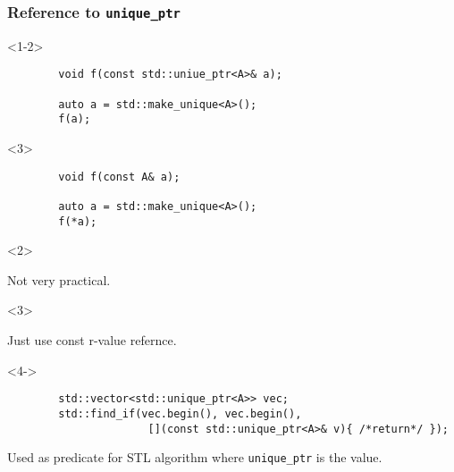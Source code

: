\documentclass{beamer}
\begin{document}
\begin{frame}[fragile,t]
\frametitle{Reference to \texttt{unique\_ptr}}
    \begin{onlyenv}<1-2>
    \begin{lstlisting}
        void f(const std::uniue_ptr<A>& a);

        auto a = std::make_unique<A>();
        f(a);
    \end{lstlisting}
    \end{onlyenv}

    \begin{onlyenv}<3>
    \begin{lstlisting}
        void f(const A& a);

        auto a = std::make_unique<A>();
        f(*a);
    \end{lstlisting}
    \end{onlyenv}

    \begin{onlyenv}<2>
    \begin{alertblock}{}
        Not very practical.
    \end{alertblock}
    \end{onlyenv}
    \begin{onlyenv}<3>
    \begin{block}{}
        Just use const r-value refernce.
    \end{block}
    \end{onlyenv}
    \begin{onlyenv}<4->
    \begin{lstlisting}
        std::vector<std::unique_ptr<A>> vec;
        std::find_if(vec.begin(), vec.begin(), 
                      [](const std::unique_ptr<A>& v){ /*return*/ });
    \end{lstlisting}
    \begin{block}{}
        Used as predicate for STL algorithm where \texttt{unique\_ptr} is the value.
    \end{block}
    \end{onlyenv}
\end{frame}
\end{document}
